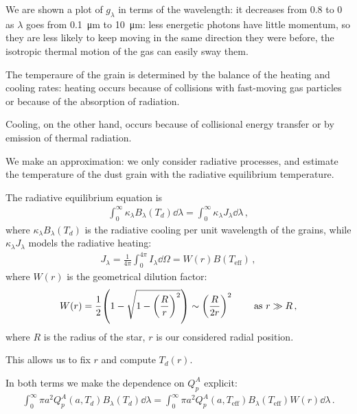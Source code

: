 \documentclass[main.tex]{subfiles}
\begin{document}
We are shown a plot of \(g_{\lambda } \) in terms of the wavelength: it decreases from \num{.8} to 0 as \(\lambda \) goes from \SI{0.1}{\micro\metre} to \SI{10}{\micro\metre}: less energetic photons have little momentum, so they are less likely to keep moving in the same direction they were before, the isotropic thermal motion of the gas can easily sway them.

The temperaure of the grain is determined by the balance of the heating and cooling rates: heating occurs because of collisions with fast-moving gas particles or because of the absorption of radiation. 

Cooling, on the other hand, occurs because of collisional energy transfer or by emission of thermal radiation. 

We make an approximation: we only consider radiative processes, and estimate the temperature of the dust grain with the radiative equilibrium temperature. 

The radiative equilibrium equation is 
%
\begin{align}
  \int_{0}^{ \infty } \kappa_{\lambda } B_{\lambda }(T_d) \dd{\lambda }
  = \int_{0}^{ \infty } \kappa_{\lambda } J_{\lambda } \dd{\lambda }
\,,
\end{align}
%
where \(\kappa_{\lambda } B_{\lambda } (T_d)\) is the radiative cooling per unit wavelength of the grains, while \(\kappa_{\lambda } J_{\lambda }\) models the radiative heating:
%
\begin{align}
  J_{\lambda } = \frac{1}{4 \pi } \int_{0}^{4 \pi } I_{\lambda } \dd{\Omega } = W(r) B( T _{\text{eff}})
\,,
\end{align}
%
where \(W(r)\) is the geometrical dilution factor: 
%
\begin{align}
  W(r ) = \frac{1}{2} \qty(1 - \sqrt{1 - \qty(\frac{R}{r})^2}) \sim \qty(\frac{R}{2r})^2
\qquad \text{ as } r \gg R
\,,
\end{align}
%
where \(R\) is the radius of the star, \(r\) is our considered radial position.

This allows us to fix \(r\) and compute \(T_d (r)\). 


In both terms we make the dependence on \(Q_p^{A}\) explicit: 
%
\begin{align}
  \int_{0}^{ \infty } \pi a^2 Q_p^{A} (a, T_d) B_\lambda (T_d) \dd{\lambda } =
  \int_{0}^{ \infty } \pi a^2 Q_p^{A} (a, T _{\text{eff}}) B_\lambda (T _{\text{eff}}) W(r) \dd{\lambda }
\,.
\end{align}
\end{document}
